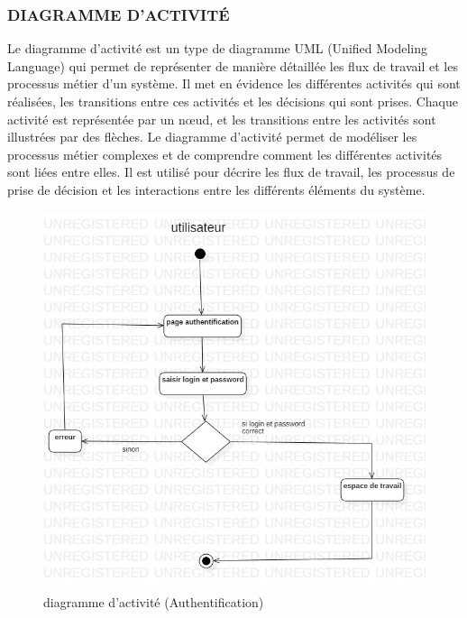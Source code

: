\documentclass[english,12pt,a4paper]{report}
\begin{document}
\clearpage
\subsubsection{DIAGRAMME D'ACTIVITÉ}
Le diagramme d'activité est un type de diagramme UML (Unified Modeling Language) qui permet de représenter de manière détaillée les flux de travail et les processus métier d'un système. Il met en évidence les différentes activités qui sont réalisées, les transitions entre ces activités et les décisions qui sont prises. Chaque activité est représentée par un nœud, et les transitions entre les activités sont illustrées par des flèches. Le diagramme d'activité permet de modéliser les processus métier complexes et de comprendre comment les différentes activités sont liées entre elles. Il est utilisé pour décrire les flux de travail, les processus de prise de décision et les interactions entre les différents éléments du système.
\begin{figure}[h]
	\centering
	\includegraphics*[height=0.5 \textheight]{ActiviteAuthentification.jpg}
	\caption{diagramme d'activité (Authentification)}
	\label{fig8: diagramme d'activité (Authentification)}
\end{figure}
\end{document}
